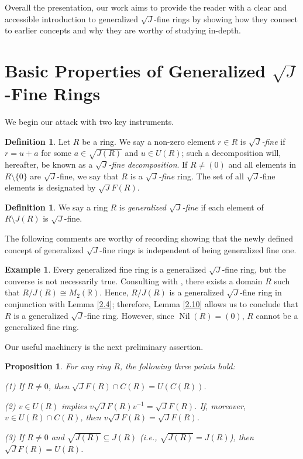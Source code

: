 \documentclass[12pt]{amsart}
\newtheorem{proposition}[theorem]{Proposition}
\theoremstyle{definition}
\newtheorem{example}[theorem]{Example}
\newtheorem{definition}[theorem]{Definition}
\begin{document}
Overall the presentation, our work aims to provide the reader with a clear and accessible introduction to generalized $\sqrt{J}$-fine rings by showing how they connect to earlier concepts and why they are worthy of studying in-depth.

\section{Basic Properties of Generalized $\sqrt{J}$-Fine Rings}

We begin our attack with two key instruments.

\begin{definition}\label{maj1}
Let \(R\) be a ring. We say a non-zero element \(r\in R\) is \textit{$\sqrt{J}$-fine} if \(r = u+a\) for some \(a\in\sqrt{J(R)}\) and \(u\in U(R)\); such a decomposition will, hereafter, be known as a \textit{$\sqrt{J}$-fine decomposition}. If $R \neq (0)$ and all elements in $R \setminus \{0\}$ are $\sqrt{J}$-fine, we say that $R$ is a \textit{$\sqrt{J}$-fine} ring. The set of all $\sqrt{J}$-fine elements is designated by $\sqrt{J}F(R)$.
\end{definition}

\begin{definition}\label{maj2}
We say a ring $R$ is \textit{generalized $\sqrt{J}$-fine} if each element of $R \setminus J(R)$ is $\sqrt{J}$-fine.
\end{definition}

The following comments are worthy of recording showing that the newly defined concept of generalized $\sqrt{J}$-fine rings is independent of being generalized fine one.

\begin{example}\label{11}
Every generalized fine ring is a generalized $\sqrt{J}$-fine ring, but the converse is not necessarily true. Consulting with \cite[Example 5]{full}, there exists a domain $R$ such that $R/J(R) \cong M_2(\mathbb{R})$. Hence, $R/J(R)$ is a generalized $\sqrt{J}$-fine ring in conjunction with Lemma \ref{2.4}; therefore, Lemma \ref{2.10} allows us to conclude that $R$ is a generalized $\sqrt{J}$-fine ring. However, since $\operatorname{Nil}(R) = (0)$, $R$ cannot be a generalized fine ring.
\end{example}

Our useful machinery is the next preliminary assertion.

\begin{proposition}\label{2}
For any ring \(R\), the following three points hold:

(1) If \(R \neq 0\), then \(\sqrt{J}F(R) \cap C(R) = U(C(R))\).

(2) \(v \in U(R)\) implies \(v\sqrt{J}F(R)v^{-1} = \sqrt{J}F(R)\). If, moreover, \(v \in U(R) \cap C(R)\), then \(v\sqrt{J}F(R) = \sqrt{J}F(R)\).

(3) If \(R \neq 0\) and \(\sqrt{J(R)} \subseteq J(R)\) (i.e., \(\sqrt{J(R)} = J(R)\)), then \(\sqrt{J}F(R) = U(R)\).
\end{proposition}
\end{document}
